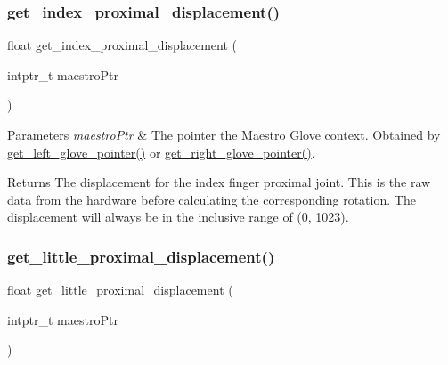 \subsubsection{\texorpdfstring{get\+\_\+index\+\_\+proximal\+\_\+displacement()}{get\_index\_proximal\_displacement()}}
{\footnotesize\ttfamily float get\+\_\+index\+\_\+proximal\+\_\+displacement (\begin{DoxyParamCaption}\item[{intptr\+\_\+t}]{maestro\+Ptr }\end{DoxyParamCaption})}


\begin{DoxyParams}{Parameters}
{\em maestro\+Ptr} & The pointer the Maestro Glove context. Obtained by \hyperlink{group__glove_management_ga63ce3c99d4a8b8db851b22af9185764e}{get\+\_\+left\+\_\+glove\+\_\+pointer()} or \hyperlink{group__glove_management_ga9b8fd9d91aeac3f8da50f7a7eba0c32b}{get\+\_\+right\+\_\+glove\+\_\+pointer()}. \\
\hline
\end{DoxyParams}
\begin{DoxyReturn}{Returns}
The displacement for the index finger proximal joint. This is the raw data from the hardware before calculating the corresponding rotation. The displacement will always be in the inclusive range of (0, 1023). 
\end{DoxyReturn}
\mbox{\label{group__displacement_access_ga010054a4a8e649390d426732de2e8792}} 
\subsubsection{\texorpdfstring{get\+\_\+little\+\_\+proximal\+\_\+displacement()}{get\_little\_proximal\_displacement()}}
{\footnotesize\ttfamily float get\+\_\+little\+\_\+proximal\+\_\+displacement (\begin{DoxyParamCaption}\item[{intptr\+\_\+t}]{maestro\+Ptr }\end{DoxyParamCaption})}


